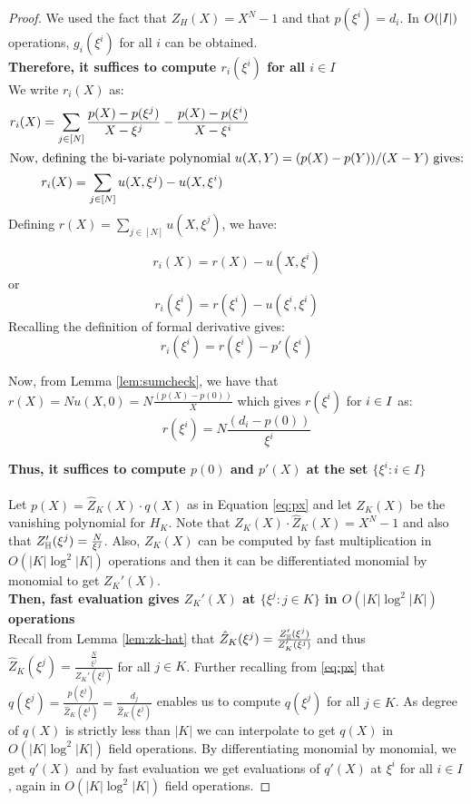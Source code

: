 \begin{proof}
    We used the fact that $Z_H(X)=X^N-1$ and that $p(\xi^i)=d_i$.
    In $O(|I|)$ operations, $g_i(\xi^i)$ for all $i$ can be obtained.\\
    \textbf{Therefore, it suffices to compute $r_i(\xi^i)$ for all $i \in I$}\\
    We write $r_i(X)$ as:
    \begin{align}\label{eq:rx}
    r_i(X) &= \sum_{j\in [N]}\frac{p(X)-p(\xi^j)}{X-\xi^j} - \frac{p(X)-p(\xi^i)}{X-\xi^i} \nonumber \\
    \intertext{Now, defining the bi-variate polynomial $u(X,Y)=(p(X) - p(Y))/(X-Y)$ gives:}
    &r_i(X)= \sum_{j\in [N]}u(X,\xi^j) - u(X,\xi^i) \nonumber
    \end{align}
    Defining $r(X)=\sum_{j\in [N]}u(X,\xi^j)$, we have:

    $$r_i(X)=r(X)-u(X, \xi^i)$$
    or
    $$r_i(\xi^i)=r(\xi^i) - u(\xi^i,\xi^i)$$
    Recalling the definition of formal derivative gives:\\

    $$r_i(\xi^i)=r(\xi^i) - p'(\xi^i) $$


    Now, from Lemma \ref{lem:sumcheck}, we have that $r(X)=N u(X,0)=N \frac{(p(X) - p(0))}{X}$ which gives $r(\xi^i)$ for $i\in I$ as:
    $$r(\xi^i)=N \frac{(d_i - p(0))}{\xi^i}$$

    \textbf{Thus, it suffices to compute $p(0)$ and $p'(X)$ at the set $\{\xi^i:i \in I\}$}\\\\
    Let $p(X)=\widehat{Z}_K(X)\cdot q(X)$
    as in Equation \eqref{eq:px} and let $Z_K(X)$ be the vanishing polynomial for $H_K$.
    Note that $Z_K(X) \cdot \hat{Z}_K(X)=X^N-1$ and also that
    $Z_{\mathbb{H}}'(\xi^j)= \frac{N}{\xi^j} $.
    Also, $Z_K(X)$ can be computed by fast multiplication in $O(|K|\log^2 |K|)$ operations and then it can be differentiated monomial by monomial to get $Z_K'(X)$.\\
    \textbf{Then, fast evaluation gives $Z_K'(X)$ at $\{\xi^j:j\in K\}$ in $O(|K|\log^2 |K|)$ operations}\\
    Recall from Lemma \ref{lem:zk-hat} that $\hat{Z}_K(\xi^j)=\frac{Z_{\mathbb{H}}'(\xi^j)}{Z_K'(\xi^j)}$ and
    thus $\hat{Z}_K(\xi^j)=\frac{\frac{N}{\xi^j}}{Z_K'(\xi^j)}$ for all $j \in K$.
    Further recalling from \eqref{eq:px} that $q(\xi^j)=\frac{p(\xi^j)} {\hat{Z}_K(\xi^j)}=\frac{d_j}{\widehat{Z}_K(\xi^j)}$ enables us to compute
    $q(\xi^j)$ for all $j \in K$.
    As degree of $q(X)$ is strictly less than $|K|$ we can interpolate to get $q(X)$ in $O(|K|\log^2 |K|)$ field operations.
    By differentiating monomial by monomial, we get $q'(X)$ and by fast evaluation we get evaluations of $q'(X)$ at $\xi^i$ for all $i \in I$, again in $O(|K|\log^2 |K|)$ field operations.


\end{proof}
